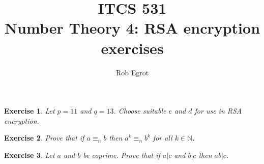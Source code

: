 \documentclass{article}
\title{ITCS 531 \\Number Theory 4: RSA encryption exercises}
\author{Rob Egrot}
\date{}
\theoremstyle{plain}
\newtheorem{Q}{Exercise}{\bfseries}{\upshape}
\newcommand{\bN}{\mathbb{N}}
\begin{document}
\maketitle

\begin{Q}
Let $p =11$ and $q=13$. Choose suitable $e$ and $d$ for use in RSA encryption.
\end{Q}
\begin{comment}
\textbf{Solution:}
We have $(p-1)(q-1) = 10\times 12 = 120$. The smallest prime that doesn't divide 120 is $7$, so set $e=7$. We need to find the inverse of $7$ mod 120. Now, $120 = 17(7) +1$, so $-17(7)-1 = -120$. This means the inverse of 7 is $-17$ mod 120, and $-17\equiv 103_{120}$. So take $d = 103$.
\end{comment}

\begin{Q}\label{\prefix Q:powers}
Prove that if $a\equiv_n b$ then $a^k\equiv_n b^k$ for all $k\in\bN$.
\end{Q}
\begin{comment}
\textbf{Solution:}
Induct on $k$. If $k=0$ then its obviously true as $1=1$. Suppose it's true for $k-1$. Then $a^k = a.a^{k-1}$ and $b^k = b.b^{k-1}$, and by assumption we have $a \equiv_n b$, and by the inductive hypothesis we have $a^{k-1}\equiv_n b^{k-1}$. Proposition \ref{P:subs}(2) applies and tells us that $a^k\equiv_n b^k$ too.
\end{comment}

\begin{Q}\label{\prefix Q:coprimeForCRT}
Let $a$ and $b$ be coprime. Prove that if $a| c$ and $b|c$ then $ab|c$.
\end{Q}
\begin{comment}
\textbf{Solution:}
By B\'ezout's identity there are $x$ and $y$ with $xa + yb = 1$. So $cxa + cyb = c$. Also, as $a| c$ there is $k$ with $ak = c$, and as $b|c$ there is $l$ with $bl = c$. So, we have
\[(bl)xa + (ak)yb = c,\]
and rearranging this gives
\[(ab)(xl + yb) = c.\]
This means $ab|c$ as claimed.

For an alternative proof, use prime factorizations $a = p_1\ldots p_m$, and $b = q_1\ldots q_n$. Since $a$ and $b$ are coprime we mist have $p_i\neq q_j$ for all $i$ and $j$. Since $a|c$ and $b|c$, this means $c = p_1\ldots p_mq_1\ldots q_nk$ for some $k$. But this means $ab|c$.
\end{comment}
\end{document}
